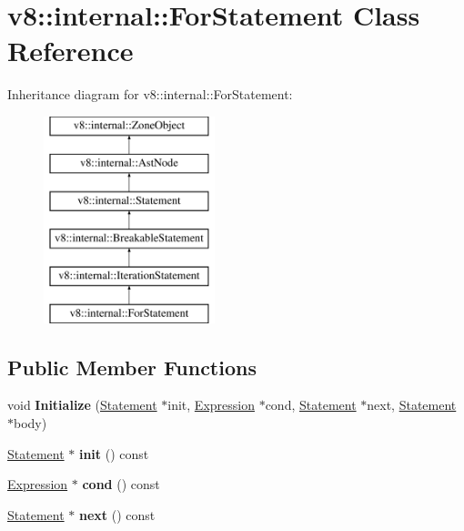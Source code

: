 \hypertarget{classv8_1_1internal_1_1ForStatement}{}\section{v8\+:\+:internal\+:\+:For\+Statement Class Reference}
\label{classv8_1_1internal_1_1ForStatement}
Inheritance diagram for v8\+:\+:internal\+:\+:For\+Statement\+:\begin{figure}[H]
\begin{center}
\leavevmode
\includegraphics[height=6.000000cm]{classv8_1_1internal_1_1ForStatement}
\end{center}
\end{figure}
\subsection*{Public Member Functions}
\begin{DoxyCompactItemize}
\item 
\mbox{\label{classv8_1_1internal_1_1ForStatement_a45ed0c83852f2640c761dd6d66cdf42c}} 
void {\bfseries Initialize} (\mbox{\hyperlink{classv8_1_1internal_1_1Statement}{Statement}} $\ast$init, \mbox{\hyperlink{classv8_1_1internal_1_1Expression}{Expression}} $\ast$cond, \mbox{\hyperlink{classv8_1_1internal_1_1Statement}{Statement}} $\ast$next, \mbox{\hyperlink{classv8_1_1internal_1_1Statement}{Statement}} $\ast$body)
\item 
\mbox{\label{classv8_1_1internal_1_1ForStatement_a484e37978fc2b419667ff8901cce09d5}} 
\mbox{\hyperlink{classv8_1_1internal_1_1Statement}{Statement}} $\ast$ {\bfseries init} () const
\item 
\mbox{\label{classv8_1_1internal_1_1ForStatement_a0eb66b760bb7ef3324efd9c4709243b7}} 
\mbox{\hyperlink{classv8_1_1internal_1_1Expression}{Expression}} $\ast$ {\bfseries cond} () const
\item 
\mbox{\label{classv8_1_1internal_1_1ForStatement_aeefc93940d8a1593a7531552b7d45fe8}} 
\mbox{\hyperlink{classv8_1_1internal_1_1Statement}{Statement}} $\ast$ {\bfseries next} () const
\end{DoxyCompactItemize}
